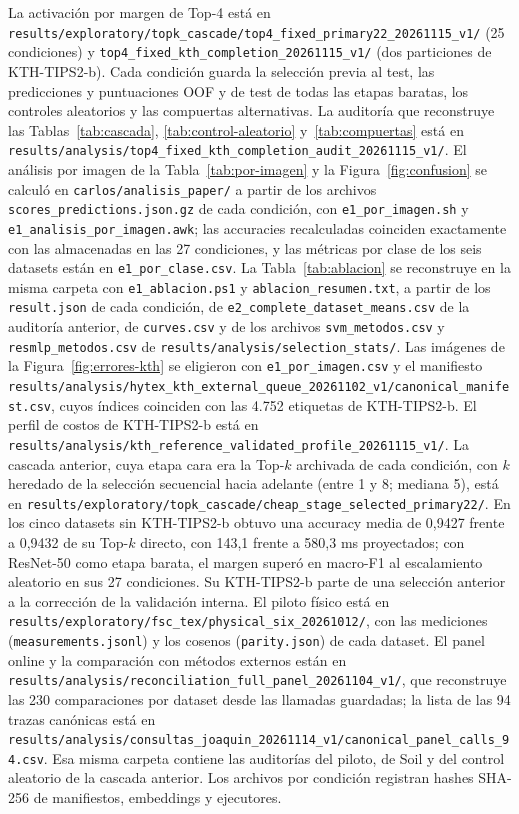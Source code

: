 \documentclass[a4paper,fleqn]{cas-sc}
\begin{document}
La activación por margen de Top-4 está en \nolinkurl{results/exploratory/topk_cascade/top4_fixed_primary22_20261115_v1/} (25 condiciones) y \nolinkurl{top4_fixed_kth_completion_20261115_v1/} (dos particiones de KTH-TIPS2-b). Cada condición guarda la selección previa al test, las predicciones y puntuaciones OOF y de test de todas las etapas baratas, los controles aleatorios y las compuertas alternativas. La auditoría que reconstruye las Tablas~\ref{tab:cascada}, \ref{tab:control-aleatorio} y~\ref{tab:compuertas} está en \nolinkurl{results/analysis/top4_fixed_kth_completion_audit_20261115_v1/}. El análisis por imagen de la Tabla~\ref{tab:por-imagen} y la Figura~\ref{fig:confusion} se calculó en \nolinkurl{carlos/analisis_paper/} a partir de los archivos \nolinkurl{scores_predictions.json.gz} de cada condición, con \nolinkurl{e1_por_imagen.sh} y \nolinkurl{e1_analisis_por_imagen.awk}; las accuracies recalculadas coinciden exactamente con las almacenadas en las 27 condiciones, y las métricas por clase de los seis datasets están en \nolinkurl{e1_por_clase.csv}. La Tabla~\ref{tab:ablacion} se reconstruye en la misma carpeta con \nolinkurl{e1_ablacion.ps1} y \nolinkurl{ablacion_resumen.txt}, a partir de los \nolinkurl{result.json} de cada condición, de \nolinkurl{e2_complete_dataset_means.csv} de la auditoría anterior, de \nolinkurl{curves.csv} y de los archivos \nolinkurl{svm_metodos.csv} y \nolinkurl{resmlp_metodos.csv} de \nolinkurl{results/analysis/selection_stats/}. Las imágenes de la Figura~\ref{fig:errores-kth} se eligieron con \nolinkurl{e1_por_imagen.csv} y el manifiesto \nolinkurl{results/analysis/hytex_kth_external_queue_20261102_v1/canonical_manifest.csv}, cuyos índices coinciden con las 4.752 etiquetas de KTH-TIPS2-b. El perfil de costos de KTH-TIPS2-b está en \nolinkurl{results/analysis/kth_reference_validated_profile_20261115_v1/}. La cascada anterior, cuya etapa cara era la Top-$k$ archivada de cada condición, con $k$ heredado de la selección secuencial hacia adelante (entre 1 y 8; mediana 5), está en \nolinkurl{results/exploratory/topk_cascade/cheap_stage_selected_primary22/}. En los cinco datasets sin KTH-TIPS2-b obtuvo una accuracy media de 0,9427 frente a 0,9432 de su Top-$k$ directo, con 143,1 frente a 580,3 ms proyectados; con ResNet-50 como etapa barata, el margen superó en macro-F1 al escalamiento aleatorio en sus 27 condiciones. Su KTH-TIPS2-b parte de una selección anterior a la corrección de la validación interna. El piloto físico está en \nolinkurl{results/exploratory/fsc_tex/physical_six_20261012/}, con las mediciones (\nolinkurl{measurements.jsonl}) y los cosenos (\nolinkurl{parity.json}) de cada dataset. El panel online y la comparación con métodos externos están en \nolinkurl{results/analysis/reconciliation_full_panel_20261104_v1/}, que reconstruye las 230 comparaciones por dataset desde las llamadas guardadas; la lista de las 94 trazas canónicas está en \nolinkurl{results/analysis/consultas_joaquin_20261114_v1/canonical_panel_calls_94.csv}. Esa misma carpeta contiene las auditorías del piloto, de Soil y del control aleatorio de la cascada anterior. Los archivos por condición registran hashes SHA-256 de manifiestos, embeddings y ejecutores.
\end{document}
